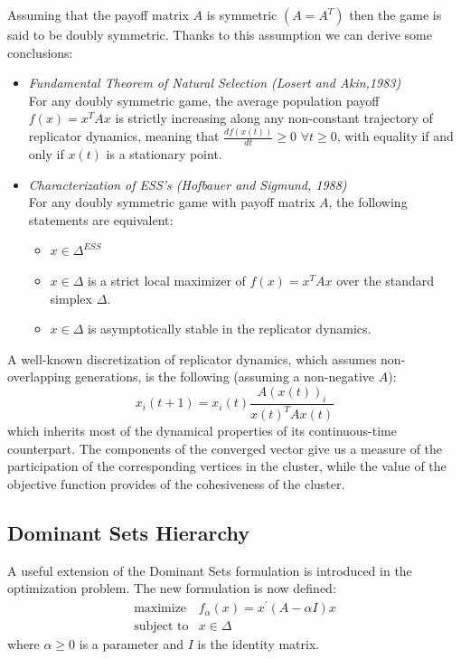 Assuming that the payoff matrix $A$ is symmetric $(A = A^T)$ then the game is said to be doubly symmetric. Thanks to this assumption we can derive some conclusions:
\begin{itemize}
	\item \textit{Fundamental Theorem of Natural Selection (Losert and Akin,1983)} \\
	For any doubly symmetric game, the average population payoff $f(x) = x^TAx$ is strictly increasing along any non-constant trajectory of replicator dynamics, meaning that $\frac{df(x(t))}{dt} \geq 0$ $\forall t \geq0$, with equality if and only if $x(t)$ is a stationary point.
	
	\item \textit{Characterization of ESS's (Hofbauer and Sigmund, 1988)}\\
	For any doubly symmetric game with payoff matrix $A$, the following statements are equivalent:
	\begin{itemize}
		\item $x\in \Delta^{ESS}$
		\item $x \in \Delta$ is a strict local maximizer of $f(x) = x^TAx$ over the standard simplex $\Delta$.
		\item $x\in\Delta$ is asymptotically stable in the replicator dynamics.
	\end{itemize}
\end{itemize}


A well-known discretization of replicator dynamics, which assumes non-overlapping generations, is the following (assuming a non-negative $A$): 
$$
x_i(t+1) = x_i(t)\frac{A(x(t))_i}{x(t)^TAx(t)}
$$
which inherits most of the dynamical properties of its continuous-time counterpart.
The components of the converged vector give us a measure of the participation of the corresponding vertices in the cluster, while the value of the objective function provides of the cohesiveness of the cluster.

\subsection{Dominant Sets Hierarchy}
A useful extension of the Dominant Sets formulation is introduced in the optimization problem. The new formulation is now defined:
\begin{equation}\label{alphaSPQ}
\begin{array}{lcl}
\text{maximize} & f_\alpha(x) = x^\prime(A - \alpha I)x\\
\text{subject to} & x \in \Delta
\end{array}
\end{equation}
where $\alpha \geq 0$ is a parameter and $I$ is the identity matrix.\\


